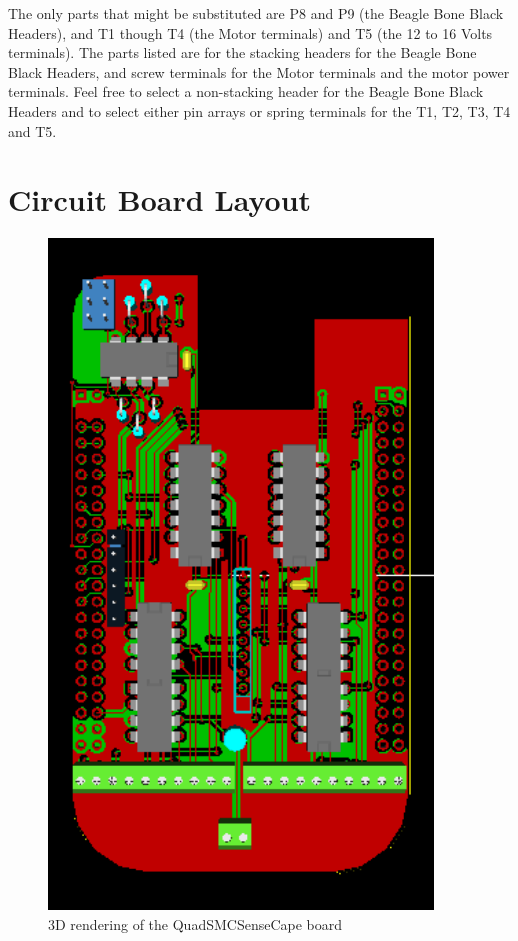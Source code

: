 The only parts that might be substituted are P8 and P9 (the Beagle Bone Black
Headers), and T1 though T4 (the Motor terminals) and T5 (the 12 to 16 Volts
terminals). The parts listed are for the stacking headers for the Beagle Bone
Black Headers, and screw terminals for the Motor terminals and the motor power
terminals. Feel free to select a non-stacking header for the Beagle Bone Black
Headers and to select either pin arrays or spring terminals for the T1, T2,
T3, T4 and T5.

\section{Circuit Board Layout}

\begin{figure}[hbpt]\begin{centering}%
\includegraphics[height=7in]{QuadSMCSenseCape3DTop.png}
\caption{3D rendering of the QuadSMCSenseCape board}
\end{centering}\end{figure}
